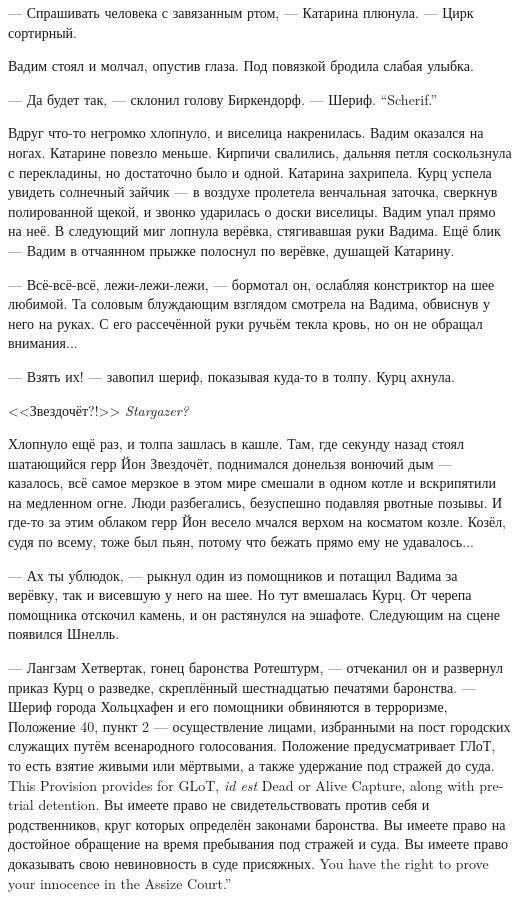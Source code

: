 --- Спрашивать человека с завязанным ртом, --- Катарина плюнула.
--- Цирк сортирный.

Вадим стоял и молчал, опустив глаза.
Под повязкой бродила слабая улыбка.

--- Да будет так, --- склонил голову Биркендорф.
{--- Шериф.}
{``Scherif.''}

\textspace

Вдруг что-то негромко хлопнуло, и виселица накренилась.
Вадим оказался на ногах.
Катарине повезло меньше.
Кирпичи свалились, дальняя петля соскользнула с перекладины, но достаточно было и одной.
Катарина захрипела.
Курц успела увидеть солнечный зайчик --- в воздухе пролетела венчальная заточка, сверкнув полированной щекой, и звонко ударилась о доски виселицы.
Вадим упал прямо на неё.
В следующий миг лопнула верёвка, стягивавшая руки Вадима.
Ещё блик --- Вадим в отчаянном прыжке полоснул по верёвке, душащей Катарину.

--- Всё-всё-всё, лежи-лежи-лежи, --- бормотал он, ослабляя констриктор на шее любимой.
Та соловым блуждающим взглядом смотрела на Вадима, обвиснув у него на руках.
С его рассечённой руки ручьём текла кровь, но он не обращал внимания...

--- Взять их! --- завопил шериф, показывая куда-то в толпу.
Курц ахнула.

{<<Звездочёт?!>>}
{\textit{Stargazer?}}

Хлопнуло ещё раз, и толпа зашлась в кашле.
Там, где секунду назад стоял шатающийся герр Йон Звездочёт, поднимался донельзя вонючий дым --- казалось, всё самое мерзкое в этом мире смешали в одном котле и вскрипятили на медленном огне.
Люди разбегались, безуспешно подавляя рвотные позывы.
И где-то за этим облаком герр Йон весело мчался верхом на косматом козле.
Козёл, судя по всему, тоже был пьян, потому что бежать прямо ему не удавалось...

--- Ах ты ублюдок, --- рыкнул один из помощников и потащил Вадима за верёвку, так и висевшую у него на шее.
Но тут вмешалась Курц.
От черепа помощника отскочил камень, и он растянулся на эшафоте.
Следующим на сцене появился Шнелль.

--- Лангзам Хетвертак, гонец баронства Ротештурм, --- отчеканил он и развернул приказ Курц о разведке, скреплённый шестнадцатью печатями баронства.
--- Шериф города Хольцхафен и его помощники обвиняются в терроризме, Положение 40, пункт 2 --- осуществление лицами, избранными на пост городских служащих путём всенародного голосования.
{Положение предусматривает ГЛоТ, то есть взятие живыми или мёртвыми, а также удержание под стражей до суда.}
{This Provision provides for GLoT, \textit{id est} Dead or Alive Capture, along with pre-trial detention.}
Вы имеете право не свидетельствовать против себя и родственников, круг которых определён законами баронства.
Вы имеете право на достойное обращение на время пребывания под стражей и суда.
{Вы имеете право доказывать свою невиновность в суде присяжных.}
{You have the right to prove your innocence in the Assize Court.''}


